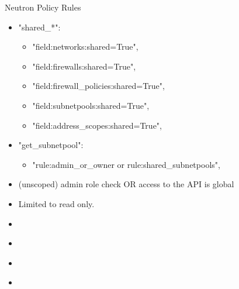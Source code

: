 \documentclass{beamer}
\begin{document}
\begin{frame}Neutron Policy Rules{}
  \begin{itemize}
  \item "shared\_*":
    \begin{itemize}
    \item "field:networks:shared=True",
    \item "field:firewalls:shared=True",
    \item "field:firewall\_policies:shared=True",
    \item "field:subnetpools:shared=True",
    \item "field:address\_scopes:shared=True",
    \end{itemize}
  \item "get\_subnetpool":
    \begin{itemize}
    \item "rule:admin\_or\_owner or rule:shared\_subnetpools",
    \end{itemize}
  \item (unscoped) admin role check OR access to the API is global
  \item Limited to read only.
  \end{itemize}
\end{frame}

\begin{frame}{}
  \begin{itemize}
  \item
  \end{itemize}
\end{frame}

\begin{frame}{}
  \begin{itemize}
  \item
  \end{itemize}
\end{frame}

\begin{frame}{}
  \begin{itemize}
  \item
  \end{itemize}
\end{frame}

\begin{frame}{}
  \begin{itemize}
  \item
  \end{itemize}
\end{frame}
\end{document}
